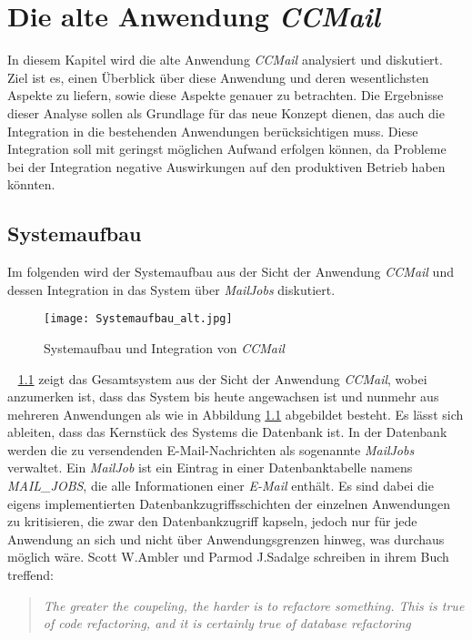 \chapter{Die alte Anwendung \emph{CCMail}}
\label{cha:ccmail}
In diesem Kapitel wird die alte Anwendung \emph{CCMail} analysiert und diskutiert. Ziel ist es, einen Überblick über diese Anwendung und deren wesentlichsten Aspekte zu liefern, sowie diese Aspekte genauer zu betrachten. Die Ergebnisse dieser Analyse sollen als Grundlage für das neue Konzept dienen, das auch die Integration in die bestehenden Anwendungen berücksichtigen muss. Diese Integration soll mit geringst möglichen Aufwand erfolgen können, da Probleme bei der Integration negative Auswirkungen auf den produktiven Betrieb haben könnten. 

\section{Systemaufbau}
\label{sec:ccmail-systemaufbau}
Im folgenden wird der Systemaufbau aus der Sicht der Anwendung \emph{CCMail} und dessen Integration in das System über \emph{MailJobs} diskutiert. 
\begin{figure}[h]
\centering
\texttt{[image: Systemaufbau\_alt.jpg]} %
\caption{Systemaufbau und Integration von \emph{CCMail}}
\label{fig:ccmail-system-und-integration}
\end{figure}
\ \newpage
{} \ref{fig:ccmail-system-und-integration} zeigt das Gesamtsystem aus der Sicht der Anwendung \emph{CCMail}, wobei anzumerken ist, dass das System bis heute angewachsen ist und nunmehr aus mehreren Anwendungen als wie in Abbildung  \ref{fig:ccmail-system-und-integration} abgebildet besteht. Es lässt sich ableiten, dass das Kernstück des Systems die Datenbank ist. In der Datenbank werden die zu versendenden E-Mail-Nachrichten als sogenannte \emph{MailJobs} verwaltet. Ein \emph{MailJob} ist ein Eintrag in einer Datenbanktabelle namens \emph{MAIL\_JOBS}, die alle Informationen einer \emph{E-Mail} enthält. Es sind dabei die eigens implementierten Datenbankzugriffsschichten der einzelnen Anwendungen zu kritisieren, die zwar den Datenbankzugriff kapseln, jedoch nur für jede Anwendung an sich und nicht über Anwendungsgrenzen hinweg, was durchaus möglich wäre. Scott W.Ambler und Parmod J.Sadalge schreiben in ihrem Buch \cite[27]{refactoreDatabase} treffend:
\begin{quote}
\emph{The greater the coupeling, the harder is to refactore something. This is true of code refactoring, and it is certainly true of database refactoring}
\end{quote}
